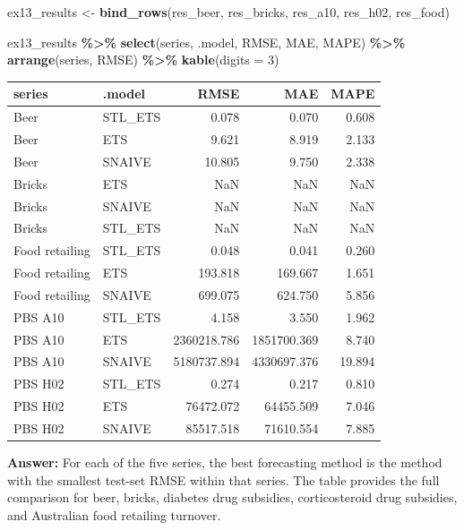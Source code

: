 \documentclass[
  11pt,
]{article}
\newenvironment{Shaded}{\begin{snugshade}}{\end{snugshade}}
\newcommand{\AttributeTok}[1]{\textcolor[rgb]{0.13,0.29,0.53}{#1}}
\newcommand{\DecValTok}[1]{\textcolor[rgb]{0.00,0.00,0.81}{#1}}
\newcommand{\FunctionTok}[1]{\textcolor[rgb]{0.13,0.29,0.53}{\textbf{#1}}}
\newcommand{\NormalTok}[1]{#1}
\newcommand{\OtherTok}[1]{\textcolor[rgb]{0.56,0.35,0.01}{#1}}
\newcommand{\SpecialCharTok}[1]{\textcolor[rgb]{0.81,0.36,0.00}{\textbf{#1}}}
\newcounter{none} %
\begin{document}
\begin{Shaded}
\begin{Highlighting}[]
\NormalTok{ex13\_results }\OtherTok{\textless{}{-}} \FunctionTok{bind\_rows}\NormalTok{(res\_beer, res\_bricks, res\_a10, res\_h02, res\_food)}

\NormalTok{ex13\_results }\SpecialCharTok{\%\textgreater{}\%}
  \FunctionTok{select}\NormalTok{(series, .model, RMSE, MAE, MAPE) }\SpecialCharTok{\%\textgreater{}\%}
  \FunctionTok{arrange}\NormalTok{(series, RMSE) }\SpecialCharTok{\%\textgreater{}\%}
  \FunctionTok{kable}\NormalTok{(}\AttributeTok{digits =} \DecValTok{3}\NormalTok{)}
\end{Highlighting}
\end{Shaded}

{\def\LTcaptype{none} %
\begin{longtable}[]{@{}llrrr@{}}
\toprule\noalign{}
series & .model & RMSE & MAE & MAPE \\
\midrule\noalign{}
\endhead
\bottomrule\noalign{}
\endlastfoot
Beer & STL\_ETS & 0.078 & 0.070 & 0.608 \\
Beer & ETS & 9.621 & 8.919 & 2.133 \\
Beer & SNAIVE & 10.805 & 9.750 & 2.338 \\
Bricks & ETS & NaN & NaN & NaN \\
Bricks & SNAIVE & NaN & NaN & NaN \\
Bricks & STL\_ETS & NaN & NaN & NaN \\
Food retailing & STL\_ETS & 0.048 & 0.041 & 0.260 \\
Food retailing & ETS & 193.818 & 169.667 & 1.651 \\
Food retailing & SNAIVE & 699.075 & 624.750 & 5.856 \\
PBS A10 & STL\_ETS & 4.158 & 3.550 & 1.962 \\
PBS A10 & ETS & 2360218.786 & 1851700.369 & 8.740 \\
PBS A10 & SNAIVE & 5180737.894 & 4330697.376 & 19.894 \\
PBS H02 & STL\_ETS & 0.274 & 0.217 & 0.810 \\
PBS H02 & ETS & 76472.072 & 64455.509 & 7.046 \\
PBS H02 & SNAIVE & 85517.518 & 71610.554 & 7.885 \\
\end{longtable}
}

\textbf{Answer:} For each of the five series, the best forecasting
method is the method with the smallest test-set RMSE within that series.
The table provides the full comparison for beer, bricks, diabetes drug
subsidies, corticosteroid drug subsidies, and Australian food retailing
turnover.
\end{document}
